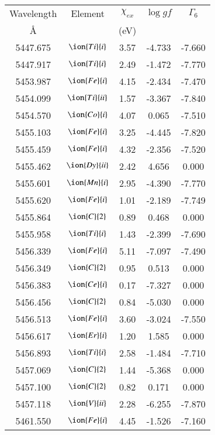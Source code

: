 \documentclass[fleqn,usenatbib]{mnras}
\begin{document}
\begin{center}
 \begin{table}
 \begin{tabular}{ccccc}
 \hline
 Wavelength & Element & $\chi_{ex}$ &  $\log gf$ & $\varGamma_{6}$ \\
   \AA{}    &         &  (eV)       &            &                  \\
 \hline
5447.675 &  $\ion{Ti}{i}$  & 3.57 & -4.733 & -7.660 \\ 
5447.917 &  $\ion{Ti}{i}$  & 2.49 & -1.472 & -7.770 \\ 
5453.987 &  $\ion{Fe}{i}$  & 4.15 & -2.434 & -7.470 \\ 
5454.099 &  $\ion{Ti}{ii}$  & 1.57 & -3.367 & -7.840 \\ 
5454.570 &  $\ion{Co}{i}$  & 4.07 & 0.065 & -7.510 \\ 
5455.103 &  $\ion{Fe}{i}$  & 3.25 & -4.445 & -7.820 \\ 
5455.459 &  $\ion{Fe}{i}$  & 4.32 & -2.356 & -7.520 \\ 
5455.462 &  $\ion{Dy}{ii}$  & 2.42 & 4.656 & 0.000 \\ 
5455.601 &  $\ion{Mn}{i}$  & 2.95 & -4.390 & -7.770 \\ 
5455.620 &  $\ion{Fe}{i}$  & 1.01 & -2.189 & -7.749 \\ 
5455.864 &  $\ion{C}{2}$ & 0.89 & 0.468 & 0.000 \\ 
5455.958 &  $\ion{Ti}{i}$  & 1.43 & -2.399 & -7.690 \\ 
5456.339 &  $\ion{Fe}{i}$  & 5.11 & -7.097 & -7.490 \\ 
5456.349 &  $\ion{C}{2}$ & 0.95 & 0.513 & 0.000 \\ 
5456.383 &  $\ion{Ce}{i}$  & 0.17 & -7.327 & 0.000 \\ 
5456.456 &  $\ion{C}{2}$ & 0.84 & -5.030 & 0.000 \\ 
5456.513 &  $\ion{Fe}{i}$  & 3.60 & -3.024 & -7.550 \\ 
5456.617 &  $\ion{Er}{i}$  & 1.20 & 1.585 & 0.000 \\ 
5456.893 &  $\ion{Ti}{i}$  & 2.58 & -1.484 & -7.710 \\ 
5457.069 &  $\ion{C}{2}$ & 1.44 & -5.368 & 0.000 \\ 
5457.100 &  $\ion{C}{2}$ & 0.82 & 0.171 & 0.000 \\ 
5457.118 &  $\ion{V}{ii}$  & 2.28 & -6.255 & -7.870 \\ 
5461.550 &  $\ion{Fe}{i}$  & 4.45 & -1.526 & -7.160 \\ 

\end{tabular}
\end{table}
\end{center}
\end{document}
